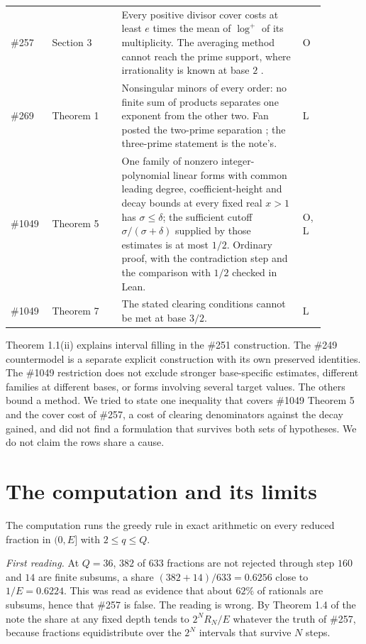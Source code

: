 \documentclass[11pt]{article}
\begin{document}
\begin{longtable}{p{0.10\linewidth}p{0.20\linewidth}p{0.52\linewidth}p{0.06\linewidth}}
\#257 \cite{plectis257} & Section 3 & Every positive divisor cover costs at least $e$ times the mean of $\log^+$ of its multiplicity.  The averaging method cannot reach the prime support, where irrationality is known at base $2$ \cite{taoteravainen2025}. & O \\
\#269 \cite{plectis269} & Theorem 1 & Nonsingular minors of every order: no finite sum of products separates one exponent from the other two.  Fan posted the two-prime separation \cite{fan2026comment}; the three-prime statement is the note's. & L \\
\#1049 \cite{plectis1049} & Theorem 5 & One family of nonzero integer-polynomial linear forms with common leading degree, coefficient-height and decay bounds at every fixed real $x>1$ has $\sigma\le\delta$; the sufficient cutoff $\sigma/(\sigma+\delta)$ supplied by those estimates is at most $1/2$.  Ordinary proof, with the contradiction step and the comparison with $1/2$ checked in Lean. & O, L \\
\#1049 \cite{plectis1049} & Theorem 7 & The stated clearing conditions cannot be met at base $3/2$. & L \\
\hline
\end{longtable}

Theorem 1.1(ii) explains interval filling in the \#251 construction.
The \#249 countermodel is a separate explicit construction with its own
preserved identities.  The \#1049 restriction does not exclude stronger
base-specific estimates, different families at different bases, or forms
involving several target values.
The others bound a method.  We tried to state one inequality that covers
\#1049 Theorem 5 and the cover cost of \#257, a cost of clearing denominators
against the decay gained, and did not find a formulation that survives both
sets of hypotheses.  We do not claim the rows share a cause.

\section{The computation and its limits}\label{sec:misread}

The computation \cite{plectisinvestigation} runs the greedy rule in exact
arithmetic on every reduced fraction in $(0,E]$ with $2\le q\le Q$.

\emph{First reading.}  At $Q=36$, $382$ of $633$ fractions are not rejected
through step $160$ and $14$ are finite subsums, a share $(382+14)/633=0.6256$
close to $1/E=0.6224$.  This was read as evidence that about $62\%$ of rationals are
subsums, hence that \#257 is false.  The reading is wrong.  By Theorem 1.4 of
the note the share at any fixed depth tends to $2^NR_N/E$ whatever the truth of
\#257, because fractions equidistribute over the $2^N$ intervals that survive
$N$ steps.
\end{document}
